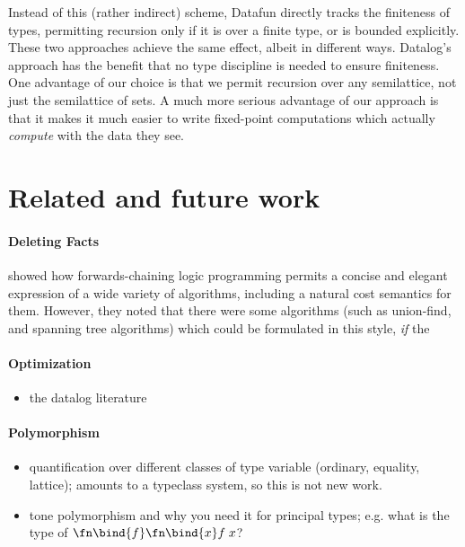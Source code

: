 Instead of this (rather indirect) scheme, Datafun directly tracks the
finiteness of types, permitting recursion only if it is over a finite
type, or is bounded explicitly. These two approaches achieve the same
effect, albeit in different ways. Datalog's approach has the benefit
that no type discipline is needed to ensure finiteness. One advantage
of our choice is that we permit recursion over any semilattice, not
just the semilattice of sets. A much more serious advantage of our
approach is that it makes it much easier to write fixed-point
computations which actually \emph{compute} with the data they see.



\section{Related and future work}
\label{sec:futurework}

\paragraph{Deleting Facts} \citet{logical-algorithms} showed how
forwards-chaining logic programming permits a concise and elegant
expression of a wide variety of algorithms, including a natural cost
semantics for them. However, they noted that there were some
algorithms (such as union-find, and spanning tree algorithms) which
could be formulated in this style, \emph{if} the



\paragraph{Optimization}
\begin{itemize}
\item \TODO the datalog literature
\end{itemize}

\paragraph{Polymorphism}
\begin{itemize}
\item \TODO quantification over different classes of type variable (ordinary,
  equality, lattice); amounts to a typeclass system, so this is not new work.
\item \TODO tone polymorphism and why you need it for principal types; e.g.
  what is the type of $\fn\bind{f}\fn\bind{x} f\;x$?
\end{itemize}

